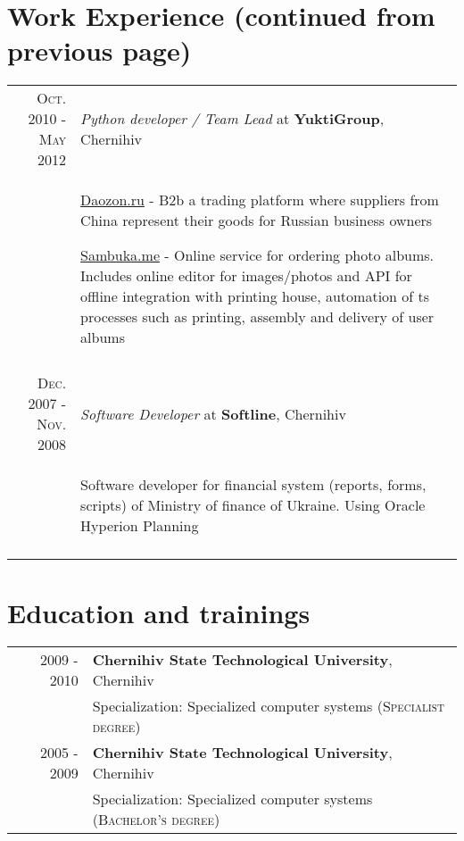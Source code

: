 \documentclass[a4paper,10pt]{article}
\begin{document}
\section{Work Experience (continued from previous page)}
\begin{tabular}{rp{10cm}}

  \textsc{Oct. 2010 - May 2012} & \emph{Python developer / Team Lead} at \textbf{YuktiGroup}, Chernihiv\\
  & \begin{compactitem}
    \item \href{http://daozon.ru}{Daozon.ru} - B2b a trading platform where suppliers from China represent their goods for Russian business owners
    \item \href{http://sambuka.me}{Sambuka.me} - Online service for ordering photo albums. Includes online editor for images/photos and API for offline integration with printing house, automation of ts processes such as printing, assembly and delivery of user albums
    \end{compactitem}\vspace{-1em} \\
\multicolumn{2}{c}{} \\

  \textsc{Dec. 2007 - Nov. 2008} & \emph{Software Developer} at \textbf{Softline}, Chernihiv\\ 
  & \begin{compactitem} 
    \item Software developer for financial system (reports, forms, scripts) of Ministry of finance of Ukraine. Using Oracle Hyperion Planning
    \end{compactitem}\vspace{-1em} \\
\multicolumn{2}{c}{} \\

\end{tabular}

\section{Education and trainings}
\begin{tabular}{rl}
2009 - 2010 & \textbf{Chernihiv State Technological University}, Chernihiv \\
 & Specialization: Specialized computer systems (\textsc{Specialist degree}) \\

2005 - 2009 & \textbf{Chernihiv State Technological University}, Chernihiv \\
 & Specialization: Specialized computer systems (\textsc{Bachelor's degree}) \\
\end{tabular}
\end{document}

